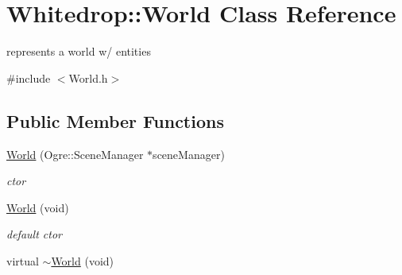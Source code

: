 \hypertarget{class_whitedrop_1_1_world}{\section{Whitedrop\+:\+:World Class Reference}
\label{class_whitedrop_1_1_world}
}


represents a world w/ entities  




{\ttfamily \#include $<$World.\+h$>$}

\subsection*{Public Member Functions}
\begin{DoxyCompactItemize}
\item 
\hyperlink{class_whitedrop_1_1_world_a3d3fd0896b742aaf814c8867d105f92b}{World} (Ogre\+::\+Scene\+Manager $\ast$scene\+Manager)
\begin{DoxyCompactList}\small\item\em ctor \end{DoxyCompactList}\item 
\hypertarget{class_whitedrop_1_1_world_a171f4ed3b7bcb7a036c5baebe35e549a}{\hyperlink{class_whitedrop_1_1_world_a171f4ed3b7bcb7a036c5baebe35e549a}{World} (void)}\label{class_whitedrop_1_1_world_a171f4ed3b7bcb7a036c5baebe35e549a}

\begin{DoxyCompactList}\small\item\em default ctor \end{DoxyCompactList}\item 
\hypertarget{class_whitedrop_1_1_world_a5929e9d24ff6095f1bfe0efa974b46e6}{virtual \hyperlink{class_whitedrop_1_1_world_a5929e9d24ff6095f1bfe0efa974b46e6}{$\sim$\+World} (void)}\label{class_whitedrop_1_1_world_a5929e9d24ff6095f1bfe0efa974b46e6}


\end{DoxyCompactItemize}
